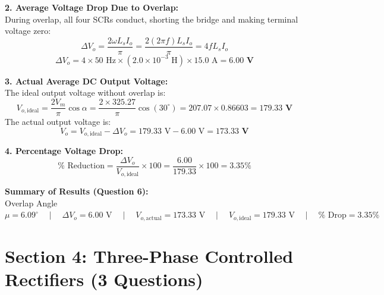 \documentclass[10pt,a4paper]{article}
\begin{document}
\noindent\textbf{2. Average Voltage Drop Due to Overlap:}\\
During overlap, all four SCRs conduct, shorting the bridge and making terminal voltage zero:
\[
\Delta V_o = \frac{2 \omega L_s I_o}{\pi} = \frac{2 (2\pi f) L_s I_o}{\pi} = 4 f L_s I_o
\]
\[
\Delta V_o = 4 \times 50\text{ Hz} \times (2.0 \times 10^{-3}\text{ H}) \times 15.0\text{ A} = \mathbf{6.00\text{ V}}
\]

\noindent\textbf{3. Actual Average DC Output Voltage:}\\
The ideal output voltage without overlap is:
\[
V_{o,\text{ideal}} = \frac{2 V_m}{\pi} \cos\alpha = \frac{2 \times 325.27}{\pi} \cos(30^\circ) = 207.07 \times 0.86603 = \mathbf{179.33\text{ V}}
\]
The actual output voltage is:
\[
V_o = V_{o,\text{ideal}} - \Delta V_o = 179.33\text{ V} - 6.00\text{ V} = \mathbf{173.33\text{ V}}
\]

\noindent\textbf{4. Percentage Voltage Drop:}\\
\[
\% \text{ Reduction} = \frac{\Delta V_o}{V_{o,\text{ideal}}} \times 100 = \frac{6.00}{179.33} \times 100 = \mathbf{3.35\%}
\]

\begin{tcolorbox}[resbox]
\textbf{\textcolor{accentcyan}{Summary of Results (Question 6):}}\\
Overlap Angle $\mu = 6.09^\circ \quad\mid\quad \Delta V_o = 6.00\text{ V} \quad\mid\quad V_{o,\text{actual}} = 173.33\text{ V} \quad\mid\quad V_{o,\text{ideal}} = 179.33\text{ V} \quad\mid\quad \% \text{ Drop} = 3.35\%$
\end{tcolorbox}

\vspace{5mm}

\section*{Section 4: Three-Phase Controlled Rectifiers (3 Questions)}
\end{document}
